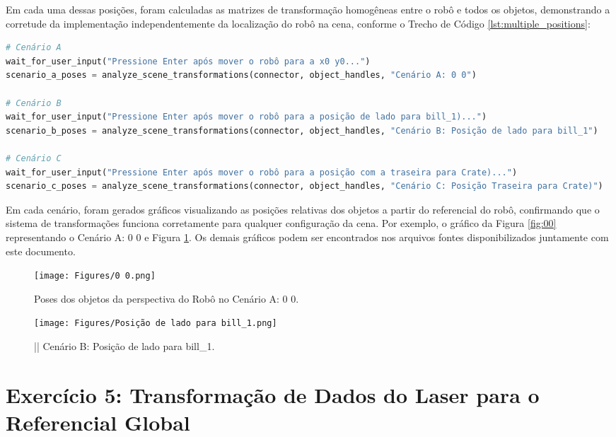Em cada uma dessas posições, foram calculadas as matrizes de transformação homogêneas entre o robô e todos os objetos, demonstrando a corretude da implementação independentemente da localização do robô na cena,  conforme o Trecho de Código \ref{lst:multiple_positions}:

\begin{lstlisting}[language=Python, caption=Análise de transformações em diferentes cenários., label=lst:multiple_positions]
# Cenário A
wait_for_user_input("Pressione Enter após mover o robô para a x0 y0...")
scenario_a_poses = analyze_scene_transformations(connector, object_handles, "Cenário A: 0 0")

# Cenário B
wait_for_user_input("Pressione Enter após mover o robô para a posição de lado para bill_1)...")
scenario_b_poses = analyze_scene_transformations(connector, object_handles, "Cenário B: Posição de lado para bill_1")

# Cenário C
wait_for_user_input("Pressione Enter após mover o robô para a posição com a traseira para Crate)...")
scenario_c_poses = analyze_scene_transformations(connector, object_handles, "Cenário C: Posição Traseira para Crate)")
\end{lstlisting}

Em cada cenário, foram gerados gráficos visualizando as posições relativas dos objetos a partir do referencial do robô, confirmando que o sistema de transformações funciona corretamente para qualquer configuração da cena. Por exemplo, o gráfico da Figura \ref{fig:00} representando o Cenário A: 0 0 e Figura \ref{fig:bill}. Os demais gráficos podem ser encontrados nos arquivos fontes disponibilizados juntamente com este documento.

\begin{figure}[H]
\centering
\begin{minipage}[b]{0.45\textwidth}
    \texttt{[image: Figures/0 0.png]} 
    \caption{Poses dos objetos da perspectiva do Robô no Cenário A: 0 0.}
    \label{fig:00}
\end{minipage}
\hfill
\begin{minipage}[b]{0.45\textwidth}
    \texttt{[image: Figures/Posição de lado para bill\_1.png]}
    \caption{|| Cenário B: Posição de lado para bill\_1.}
    \label{fig:bill}
\end{minipage}
\end{figure}

\section{Exercício 5: Transformação de Dados do Laser para o Referencial Global} \label{sec:ex5}

